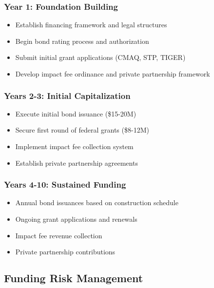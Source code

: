 \documentclass[11pt,letterpaper]{article}
\begin{document}
\subsubsection{Year 1: Foundation Building}
\begin{itemize}
    \item Establish financing framework and legal structures
    \item Begin bond rating process and authorization
    \item Submit initial grant applications (CMAQ, STP, TIGER)
    \item Develop impact fee ordinance and private partnership framework
\end{itemize}

\subsubsection{Years 2-3: Initial Capitalization}
\begin{itemize}
    \item Execute initial bond issuance (\$15-20M)
    \item Secure first round of federal grants (\$8-12M)
    \item Implement impact fee collection system
    \item Establish private partnership agreements
\end{itemize}

\subsubsection{Years 4-10: Sustained Funding}
\begin{itemize}
    \item Annual bond issuances based on construction schedule
    \item Ongoing grant applications and renewals
    \item Impact fee revenue collection
    \item Private partnership contributions
\end{itemize}

\subsection{Funding Risk Management}
\end{document}
